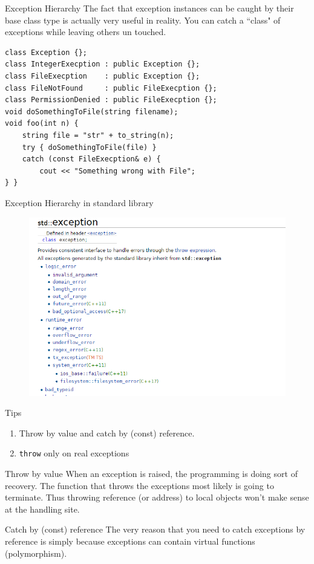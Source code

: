 \begin{frame}[fragile]{Exception Hierarchy}
The fact that exception instances can be caught by their base class type is actually very useful in reality. You can catch a ``class" of exceptions while leaving others un touched.
\begin{verbatim}
class Exception {};
class IntegerExecption : public Exception {};
class FileExecption    : public Exception {};
class FileNotFound     : public FileExecption {};
class PermissionDenied : public FileExecption {};
void doSomethingToFile(string filename);
void foo(int n) {
    string file = "str" + to_string(n);
    try { doSomethingToFile(file) }
    catch (const FileExecption& e) {
    	cout << "Something wrong with File"; 
} }
\end{verbatim}
\end{frame}

\begin{frame}{Exception Hierarchy in standard library}
\vspace{-0.2in}
\begin{figure}
	\centering
	\includegraphics[scale=0.55]{fig/rc6stdexp}
\end{figure}
\end{frame}

\begin{frame}{Tips}
\begin{enumerate}
	\item Throw by value and catch by (const) reference.
	\item \texttt{throw} only on real exceptions
\end{enumerate}
\begin{block}{Throw by value}
	When an exception is raised, the programming is doing sort of recovery. The function that throws the exceptions most likely is going to terminate.
	Thus throwing reference (or address) to local objects won't make sense at the handling site.  
\end{block}
\begin{block}{Catch by (const) reference}
	The very reason that you need to catch exceptions by reference is simply because exceptions can contain virtual functions (polymorphism).
\end{block}
\end{frame}